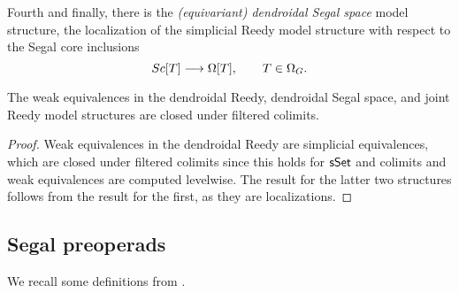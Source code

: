 \documentclass[a4paper,10pt
,draft
]{article}%
\renewcommand{\1}{\eta}%
\begin{document}
Fourth and finally, there is the \textit{(equivariant) dendroidal Segal space} model structure,
the localization of the simplicial Reedy model structure with respect to the Segal core inclusions
\[
      Sc[T] \longrightarrow \Omega[T],
      \qquad
      T \in \Omega_G.
\]

\begin{lemma}
      \label{FCOLIM_WE_LEM}
      The weak equivalences in the dendroidal Reedy, dendroidal Segal space, and joint Reedy model structures are closed under filtered colimits.
\end{lemma}
\begin{proof}
      Weak equivalences in the dendroidal Reedy are simplicial equivalences, which are closed under filtered colimits
      since this holds for $\mathsf{sSet}$ and colimits and weak equivalences are computed levelwise.
      The result for the latter two structures follows from the result for the first, as they are localizations.
\end{proof}



\subsection{Segal preoperads}
\label{SPREOP_SEC}

We recall some definitions from \cite[\S4,5]{BP_edss}.
\end{document}
